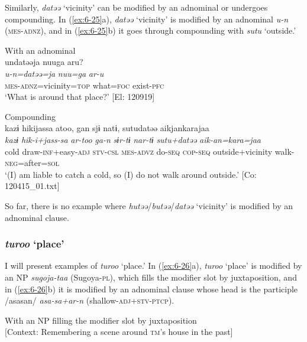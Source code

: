 Similarly, \textit{datəə} ‘vicinity’ can be modified by an adnominal or undergoes compounding. In (\ref{ex:6-25}a), \textit{datəə} ‘vicinity’ is modified by an adnominal \textit{u-n} (\textsc{mes}-\textsc{adnz}), and in (\ref{ex:6-25}b) it goes through compounding with \textit{sutu} ‘outside.’

\ea\label{ex:6-25}
\ea With an adnominal\\
{\TM}
\glll  undatəəja  nuuga  aru?\\
\textit{u-n=datəə=ja}  \textit{nuu=ga}  \textit{ar-u}\\
\textsc{mes}-\textsc{adnz}=vicinity=\textsc{top}  what=\textsc{foc}  exist-\textsc{pfc}\\
\glt ‘What is around that place?’ [El: 120919]

\ex Compounding\\
{\TM}
\glll  kazɨ  hikijassa  atoo,  gan  sjɨ  natɨ,      sutudatəə  aikjankarajaa\\
\textit{kazɨ}  \textit{hik-i+jass-sa}  \textit{ar-too}  \textit{ga-n}  \textit{sɨr-tɨ}  \textit{nar-tɨ}  \textit{sutu+datəə}  \textit{aik-an=kara=jaa}\\
cold  draw-\textsc{inf}+easy-\textsc{adj}  \textsc{stv}-\textsc{csl}  \textsc{mes}-\textsc{advz}  do-\textsc{seq}  \textsc{cop}-\textsc{seq}   outside+vicinity  walk-\textsc{neg}=after=\textsc{sol}\\
\glt ‘(I) am liable to catch a cold, so (I) do not walk around outside.’ [Co: 120415\_01.txt]
\z
\z

So far, there is no example where \textit{hutəə}/\textit{butəə}/\textit{datəə} ‘vicinity’ is modified by an adnominal clause.

\subsubsection{ \textit{turoo} ‘place’}

I will present examples of \textit{turoo} ‘place.’ In (\ref{ex:6-26}a), \textit{turoo} ‘place’ is modified by an NP \textit{sugoja-taa} (Sugoya-\textsc{pl}), which fills the modifier slot by juxtaposition, and in (\ref{ex:6-26}b) it is modified by an adnominal clause whose head is the participle /asasan/ \textit{asa-sa+ar-n} (shallow-\textsc{adj}+\textsc{stv}-\textsc{ptcp}).

\ea\label{ex:6-26}
\ea With an NP filling the modifier slot by juxtaposition\\{}
[Context: Remembering a scene around \textsc{tm}’s house in the past]

